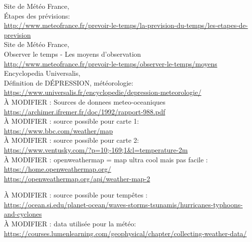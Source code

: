 \documentclass[12pt]{report}
\begin{document}

\begin{thebibliography}{9}

    Site de Météo France,\\
    Étapes des prévisions:\\
    \url{http://www.meteofrance.fr/prevoir-le-temps/la-prevision-du-temps/les-etapes-de-prevision}\\

    Site de Météo France,\\
    Observer le temps - Les moyens d'observation\\
    \url{http://www.meteofrance.fr/prevoir-le-temps/observer-le-temps/moyens}\\
    
    Encyclopedia Universalis,\\
    Définition de DÉPRESSION, météorologie:\\
    \url{https://www.universalis.fr/encyclopedie/depression-meteorologie/}\\

    À MODIFIER : Sources de donnees meteo-oceaniques\\
    \url{https://archimer.ifremer.fr/doc/1992/rapport-988.pdf}\\

    À MODIFIER : source possible pour carte 1:\\
    \url{https://www.bbc.com/weather/map }    \\

    À MODIFIER : source possible pour carte 2:\\
    \url{https://www.ventusky.com/?p=10;-169;1&l=temperature-2m} \\

    À MODIFIER : openweathermap = map ultra cool mais pas facile :\\
    \url{https://home.openweathermap.org/} \\
    \url{https://openweathermap.org/api/weather-map-2}\\

    \clearpage
    \thispagestyle{plain}

    À MODIFIER : source possible pour tempêtes :\\
    \url{https://ocean.si.edu/planet-ocean/waves-storms-tsunamis/hurricanes-typhoons-and-cyclones}\\

    À MODIFIER : data utilisée pour la météo:\\
    \url{https://courses.lumenlearning.com/geophysical/chapter/collecting-weather-data/}\\

\end{thebibliography}
\end{document}
